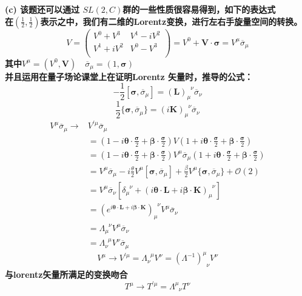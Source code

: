 \documentclass{article}
\begin{document}
\bf(c)
该题还可以通过 $SL(2,C)$群的一些性质很容易得到，如下的表达式\\
在$(\frac{1}{2},\frac{1}{2})$表示之中，我们有二维的Lorentz变换，进行左右手旋量空间的转换。
$$
V = 
\left(
	\begin{matrix}
		V^0 + V^3 & V^1 - iV^2 \\
		V^1 + iV^2 & V^0 - V^3 \\
	\end{matrix} 
\right) = V^{0} + \mathbf{V} \cdot \boldsymbol{\sigma} = V^{\mu} \overline{\sigma}_{\mu}
$$
其中$V^{\mu} = (V^{0}, \mathbf{V}) \quad \overline{\sigma}_{\mu}=(1,\boldsymbol{\sigma})  $ \\
并且运用在量子场论课堂上在证明Lorentz 矢量时，推导的公式：
$$
-\frac{1}{2}[\boldsymbol{\sigma},\overline{\sigma}_{\mu}] = (\mathbf{L})_{\mu}^{\phantom{\mu} \nu} \overline{\sigma}_{\nu}
$$
$$
\frac{1}{2}\{\boldsymbol{\sigma},\overline{\sigma}_{\mu}\} = (i\mathbf{K})_{\mu}^{\phantom{\mu} \nu} \overline{\sigma}_{\nu}
$$
\begin{align}
V^{\mu} \overline{\sigma}_{\mu}  \rightarrow &V^{\prime \mu} \overline{\sigma}_{\mu}  \nonumber \\
  &=(1- i \boldsymbol{\theta} \cdot \frac{\boldsymbol{\sigma}}{2} +\boldsymbol{\beta} \cdot \frac{\boldsymbol{\sigma}}{2}) V (1+ i \boldsymbol{\theta} \cdot \frac{\boldsymbol{\sigma}}{2} +\boldsymbol{\beta} \cdot \frac{\boldsymbol{\sigma}}{2}) \nonumber \\
  &= (1- i \boldsymbol{\theta} \cdot \frac{\boldsymbol{\sigma}}{2} +\boldsymbol{\beta} \cdot \frac{\boldsymbol{\sigma}}{2}) V^{\mu} \overline{\sigma}_{\mu}(1+ i \boldsymbol{\theta} \cdot \frac{\boldsymbol{\sigma}}{2} +\boldsymbol{\beta} \cdot \frac{\boldsymbol{\sigma}}{2}) \nonumber \\
  &= V^{\mu} \overline{\sigma}_{\mu} - i \frac{\theta}{2} V^{\mu} [\boldsymbol{\sigma},\overline{\sigma}_{\mu}] + \frac{\beta}{2} V^{\mu} \{\boldsymbol{\sigma},\overline{\sigma}_{\mu}\} + \mathcal{O}(2) \nonumber \\
   &=V^{\mu} \overline{\sigma}_{\nu}[\delta_{\mu}^{\phantom{\mu} \nu}  + (i \boldsymbol{\theta} \cdot \mathbf{L}+i\boldsymbol{\beta} \cdot \mathbf{K})_{\mu}^{\phantom{\mu} \nu} ] \nonumber \\
   &=(e^{i \boldsymbol{\theta} \cdot \mathbf{L}+i\boldsymbol{\beta} \cdot \mathbf{K}})_{\mu}^{\phantom{\mu} \nu}  V^{\mu} \overline{\sigma}_{\nu} \nonumber \\
   &=\Lambda_{\mu}^{\phantom{\mu} \nu} V^{\mu} \overline{\sigma}_{\nu} \nonumber \\
   &=\Lambda_{\nu}^{\phantom{\nu} \mu} V^{\nu} \overline{\sigma}_{\mu} \nonumber 
\end{align}
$$
V^{\mu} \rightarrow V^{\prime \mu} =\Lambda_{\nu}^{\phantom{\nu} \mu} V^{\nu} = (\Lambda^{-1})^{\mu}_{\phantom{\mu} \nu} V^{\nu}
$$
与lorentz矢量所满足的变换吻合
$$T^{\mu} \rightarrow T^{\prime \mu} = \Lambda^{\mu}_{\phantom{\mu}\nu} T^{\nu}$$
\end{document}
